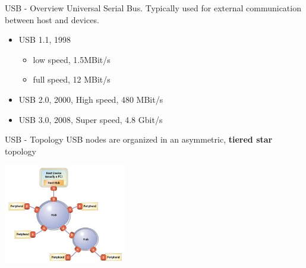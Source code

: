 \begin{frame}{USB - Overview}
  Universal Serial Bus. Typically used for external communication between
  host and devices.

  \begin{itemize}
  \item USB 1.1, 1998
    \begin{itemize}
    \item low speed, 1.5MBit/s
    \item full speed, 12 MBit/s
    \end{itemize}
  \item USB 2.0, 2000, High speed, 480 MBit/s
  \item USB 3.0, 2008, Super speed, 4.8 Gbit/s
  \end{itemize}

\end{frame}

\begin{frame}{USB - Topology}
  USB nodes are organized in an asymmetric, \textbf{tiered star} topology
  \smallskip
  \begin{center}
    \includegraphics[width=0.4\textwidth]{figures/usb_topo.jpg}
  \end{center}
\end{frame}

